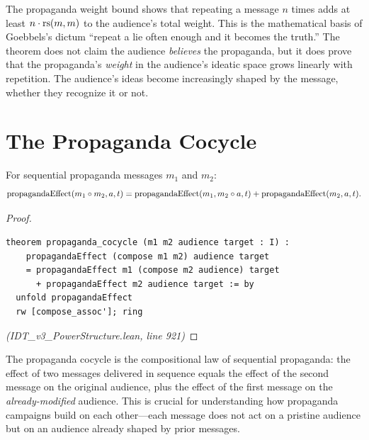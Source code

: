 \begin{interpretation}
The propaganda weight bound shows that repeating a message $n$ times adds at
least $n \cdot \mathrm{rs}(m,m)$ to the audience's total weight. This is the mathematical
basis of Goebbels's dictum ``repeat a lie often enough and it becomes the truth.''
The theorem does not claim the audience \emph{believes} the propaganda, but it
does prove that the propaganda's \emph{weight} in the audience's ideatic space
grows linearly with repetition. The audience's ideas become increasingly shaped
by the message, whether they recognize it or not.
\end{interpretation}

\section{The Propaganda Cocycle}

\begin{theorem}
\label{thm:propaganda-cocycle}
For sequential propaganda messages $m_1$ and $m_2$:
\[
  \mathrm{propagandaEffect}(m_1 \circ m_2, a, t) = \mathrm{propagandaEffect}(m_1, m_2 \circ a, t) + \mathrm{propagandaEffect}(m_2, a, t).
\]
\end{theorem}

\begin{proof}
\begin{lstlisting}
theorem propaganda_cocycle (m1 m2 audience target : I) :
    propagandaEffect (compose m1 m2) audience target
    = propagandaEffect m1 (compose m2 audience) target
      + propagandaEffect m2 audience target := by
  unfold propagandaEffect
  rw [compose_assoc']; ring
\end{lstlisting}
\textit{(IDT\_v3\_PowerStructure.lean, line 921)}
\end{proof}

\begin{interpretation}
The propaganda cocycle is the compositional law of sequential propaganda: the
effect of two messages delivered in sequence equals the effect of the second
message on the original audience, plus the effect of the first message on
the \emph{already-modified} audience. This is crucial for understanding how
propaganda campaigns build on each other---each message does not act on a
pristine audience but on an audience already shaped by prior messages.
\end{interpretation}

